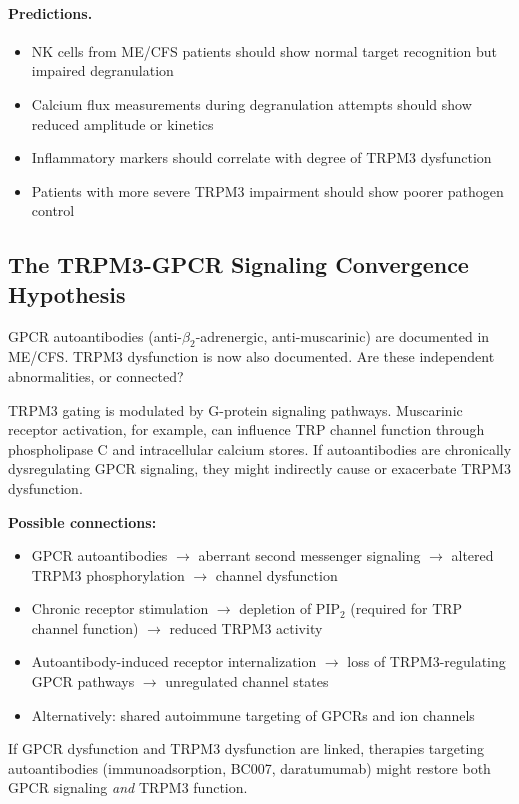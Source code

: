\paragraph{Predictions.}
\begin{itemize}
    \item NK cells from ME/CFS patients should show normal target recognition but impaired degranulation
    \item Calcium flux measurements during degranulation attempts should show reduced amplitude or kinetics
    \item Inflammatory markers should correlate with degree of TRPM3 dysfunction
    \item Patients with more severe TRPM3 impairment should show poorer pathogen control
\end{itemize}

\subsection{The TRPM3-GPCR Signaling Convergence Hypothesis}

\begin{open_question}
GPCR autoantibodies (anti-$\beta_2$-adrenergic, anti-muscarinic) are documented in ME/CFS. TRPM3 dysfunction is now also documented. Are these independent abnormalities, or connected?

TRPM3 gating is modulated by G-protein signaling pathways. Muscarinic receptor activation, for example, can influence TRP channel function through phospholipase C and intracellular calcium stores. If autoantibodies are chronically dysregulating GPCR signaling, they might indirectly cause or exacerbate TRPM3 dysfunction.

\textbf{Possible connections:}
\begin{itemize}
    \item GPCR autoantibodies $\rightarrow$ aberrant second messenger signaling $\rightarrow$ altered TRPM3 phosphorylation $\rightarrow$ channel dysfunction
    \item Chronic receptor stimulation $\rightarrow$ depletion of PIP$_2$ (required for TRP channel function) $\rightarrow$ reduced TRPM3 activity
    \item Autoantibody-induced receptor internalization $\rightarrow$ loss of TRPM3-regulating GPCR pathways $\rightarrow$ unregulated channel states
    \item Alternatively: shared autoimmune targeting of GPCRs and ion channels
\end{itemize}

If GPCR dysfunction and TRPM3 dysfunction are linked, therapies targeting autoantibodies (immunoadsorption, BC007, daratumumab) might restore both GPCR signaling \textit{and} TRPM3 function.
\end{open_question}

